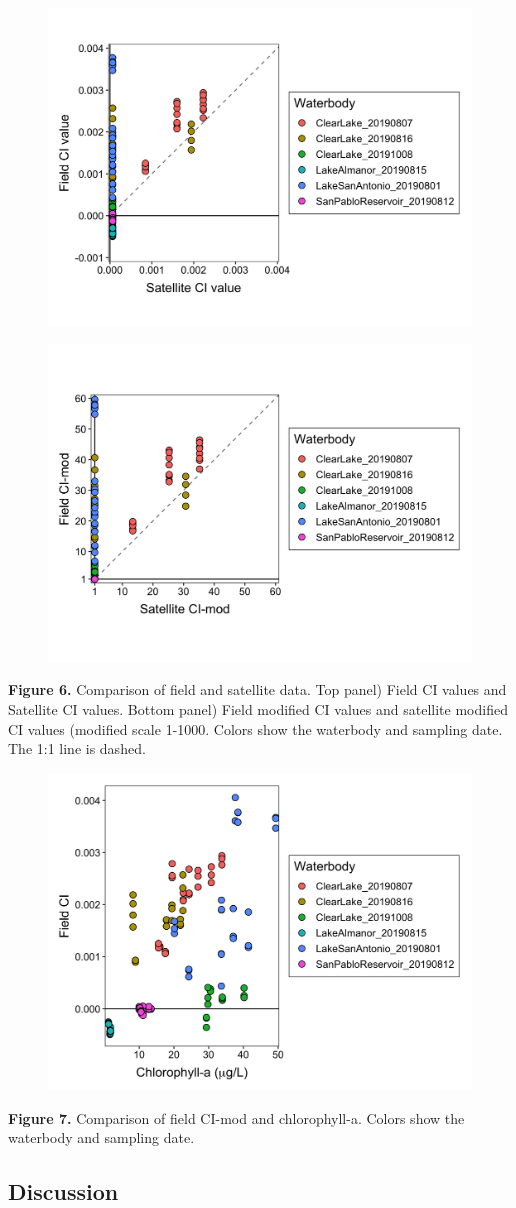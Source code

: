 \documentclass[]{article}
\begin{document}
\begin{figure}

{\centering \includegraphics[width=0.6\linewidth]{../Data/Figures_output/ci_fs} 

}

\end{figure}
\begin{figure}

{\centering \includegraphics[width=0.6\linewidth]{../Data/Figures_output/ci_mod_fs} 

}

\end{figure}

\textbf{Figure 6.} Comparison of field and satellite data. Top panel)
Field CI values and Satellite CI values. Bottom panel) Field modified CI
values and satellite modified CI values (modified scale 1-1000. Colors
show the waterbody and sampling date. The 1:1 line is dashed.

\begin{figure}

{\centering \includegraphics[width=0.6\linewidth]{../Data/Figures_output/ci_chla} 

}

\end{figure}

\textbf{Figure 7.} Comparison of field CI-mod and chlorophyll-a. Colors
show the waterbody and sampling date.

\hypertarget{discussion}{%
\subsection{\texorpdfstring{\textbf{Discussion}}{Discussion}}\label{discussion}}
\end{document}
